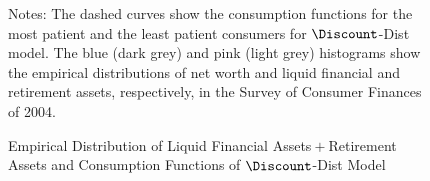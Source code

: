 \begin{figure}
\caption{Empirical Distribution of Liquid Financial
Assets${}+{}$Retirement Assets and Consumption Functions of
 $\Discount$-Dist Model}
\label{CFuncDistSevenPermAndHistNetWorthLiqFinPlsRetPlot}
\footnotesize Notes: The dashed curves show the consumption functions
for the most patient and the least patient consumers for
$\Discount$-Dist model. The blue (dark grey) and pink (light grey)
histograms show the empirical distributions of net worth and liquid
financial and retirement assets, respectively, in the Survey of
Consumer Finances of 2004.
\end{figure}
